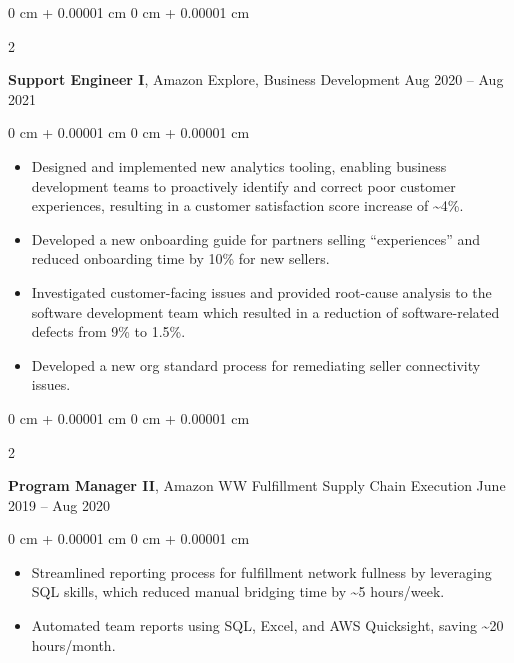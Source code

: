 \documentclass[10pt, letterpaper]{article}
\newenvironment{highlights}{
    \begin{itemize}[
        topsep=0.10 cm,
        parsep=0.10 cm,
        partopsep=0pt,
        itemsep=0pt,
        leftmargin=0 cm + 10pt
    ]
}{
    \end{itemize}
} %
\newenvironment{onecolentry}{
    \begin{adjustwidth}{
        0 cm + 0.00001 cm
    }{
        0 cm + 0.00001 cm
    }
}{
    \end{adjustwidth}
} %
\newenvironment{twocolentry}[2][]{
    \onecolentry
    \def\secondColumn{#2}
    \setcolumnwidth{\fill, 4.5 cm}
    \begin{paracol}{2}
}{
    \switchcolumn \raggedleft \secondColumn
    \end{paracol}
    \endonecolentry
} %
\begin{document}
        \vspace{0.2 cm}

        \begin{twocolentry}{
            Aug 2020 – Aug 2021
        }
            \textbf{Support Engineer I}, Amazon Explore, Business Development\end{twocolentry}

        \vspace{0.10 cm}
        \begin{onecolentry}
            \begin{highlights}
                \item Designed and implemented new analytics tooling, enabling business development teams to proactively identify and correct poor customer experiences, resulting in a customer satisfaction score increase of \textasciitilde{}4\%.
                \item Developed a new onboarding guide for partners selling “experiences” and reduced onboarding time by 10\% for new sellers.
                \item Investigated customer-facing issues and provided root-cause analysis to the software development team which resulted in a reduction of software-related defects from 9\% to 1.5\%.
                \item Developed a new org standard process for remediating seller connectivity issues.
            \end{highlights}
        \end{onecolentry}


        \vspace{0.2 cm}

        \begin{twocolentry}{
            June 2019 – Aug 2020
        }
            \textbf{Program Manager II}, Amazon WW Fulfillment Supply Chain Execution\end{twocolentry}

        \vspace{0.10 cm}
        \begin{onecolentry}
            \begin{highlights}
                \item Streamlined reporting process for fulfillment network fullness by leveraging SQL skills, which reduced manual bridging time by \textasciitilde{}5 hours/week.
                \item Automated team reports using SQL, Excel, and AWS Quicksight, saving \textasciitilde{}20 hours/month.
            \end{highlights}
        \end{onecolentry}
\end{document}

